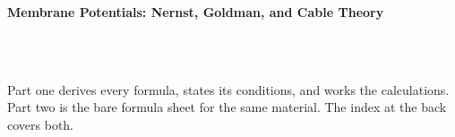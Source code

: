 



\makeindex[title={Index of This Volume},columns=2,intoc]

\begin{titlepage}\thispagestyle{empty}
\vspace*{0.14\textheight}
\noindent{\color{tiercore}\rule{\textwidth}{5pt}}\\[3pt]
\noindent{\color{bioline}\rule{\textwidth}{1pt}}\\[26pt]
\\[12pt]
\noindent\begin{minipage}{\textwidth}\raggedright
{\sffamily\bfseries\fontsize{28}{32}\selectfont\color{bioink}%
 \hyphenchar{} Membrane Potentials: Nernst, Goldman, and Cable Theory\par}\end{minipage}\\[16pt]
\noindent{\color{biogreen}\rule{\textwidth}{1.4pt}}\\[10pt]
\noindent\begin{minipage}{\textwidth}\raggedright
{\fontsize{10.5}{14}\selectfont\color{biogreen}%
Part one derives every formula, states its conditions, and works the calculations. Part two is the
bare formula sheet for the same material. The index at the back covers both.\par}\end{minipage}
\vfill
\noindent{\color{bioline}\rule{\textwidth}{1pt}}\\[3pt]
\noindent{\color{tiercore}\rule{\textwidth}{5pt}}
\end{titlepage}
\tableofcontents
\clearpage
{}
\clearpage
\printindex

